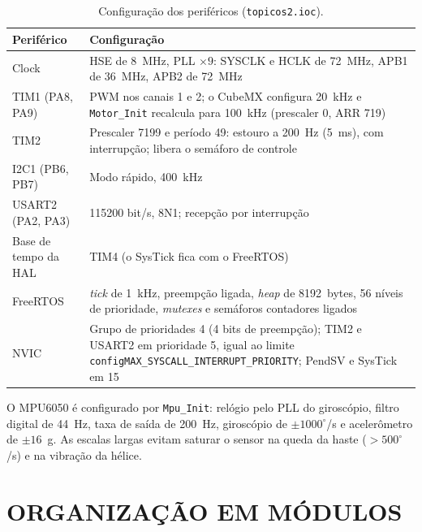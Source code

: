 \begin{table}[H]
\centering\caption{Configuração dos periféricos (\texttt{topicos2.ioc}).}\label{tab:config}
\begin{tabularx}{\textwidth}{lX}
\hline\textbf{Periférico} & \textbf{Configuração}\\\hline
Clock & HSE de 8~MHz, PLL $\times9$: SYSCLK e HCLK de 72~MHz, APB1 de 36~MHz, APB2 de 72~MHz\\
TIM1 (PA8, PA9) & PWM nos canais 1 e 2; o CubeMX configura 20~kHz e \texttt{Motor\_Init} recalcula para 100~kHz (prescaler 0, ARR 719)\\
TIM2 & Prescaler 7199 e período 49: estouro a 200~Hz (5~ms), com interrupção; libera o semáforo de controle\\
I2C1 (PB6, PB7) & Modo rápido, 400~kHz\\
USART2 (PA2, PA3) & 115200 bit/s, 8N1; recepção por interrupção\\
Base de tempo da HAL & TIM4 (o SysTick fica com o FreeRTOS)\\
FreeRTOS & \textit{tick} de 1~kHz, preempção ligada, \textit{heap} de 8192~bytes, 56 níveis de prioridade, \textit{mutexes} e semáforos contadores ligados\\
NVIC & Grupo de prioridades 4 (4 bits de preempção); TIM2 e USART2 em prioridade 5, igual ao limite \texttt{configMAX\_SYSCALL\_INTERRUPT\_PRIORITY}; PendSV e SysTick em 15\\\hline
\end{tabularx}
\end{table}
O MPU6050 é configurado por \texttt{Mpu\_Init}: relógio pelo PLL do giroscópio, filtro digital de 44~Hz, taxa de saída de 200~Hz, giroscópio de $\pm1000^\circ$/s e acelerômetro de $\pm16$~g. As escalas largas evitam saturar o sensor na queda da haste ($>500^\circ$/s) e na vibração da hélice.

\section{ORGANIZAÇÃO EM MÓDULOS}

